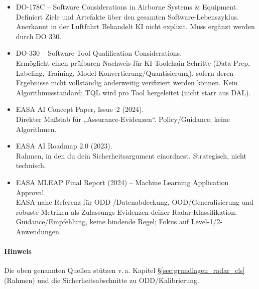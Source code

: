 \begin{itemize}
      
  \item DO-178C – Software Considerations in Airborne Systems \& Equipment.\\
      {Definiert Ziele und Artefakte über den gesamten Software-Lebenszyklus. Anerkannt in der Luftfahrt}
      {Behandelt KI nicht explizit. Muss ergänzt werden durch DO 330.}

  \item DO-330 – Software Tool Qualification Considerations.\\
      {Ermöglicht einen prüfbaren Nachweis für KI-Toolchain-Schritte (Data-Prep, Labeling, Training, Model-Konvertierung/Quantisierung), sofern deren Ergebnisse nicht vollständig anderweitig verifiziert werden können.}
      {Kein Algorithmusstandard; TQL wird pro Tool hergeleitet (nicht starr aus DAL).}

  \item EASA AI Concept Paper, Issue~2 (2024).\\
      {Direkter Maßstab für „Assurance-Evidenzen“.}
      {Policy/Guidance, keine Algorithmen.}

  \item EASA AI Roadmap 2.0 (2023).\\
      {Rahmen, in den du dein Sicherheitsargument einordnest.}
      {Strategisch, nicht technisch.}


  \item EASA MLEAP Final Report (2024) – Machine Learning Application Approval.\\
      {EASA-nahe Referenz für ODD-/Datenabdeckung, OOD/Generalisierung und robuste Metriken als Zulassungs-Evidenzen deiner Radar-Klassifikation.}
      {Guidance/Empfehlung, keine bindende Regel; Fokus auf Level-1/2-Anwendungen.}
\end{itemize}

\paragraph{Hinweis} Die oben genannten Quellen stützen v.\,a. Kapitel \S\ref{sec:grundlagen_radar_cls} (Rahmen) und die Sicherheitsabschnitte zu ODD/Kalibrierung.

